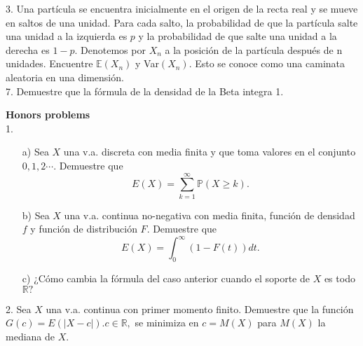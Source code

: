 \documentclass[11pt,letterpaper]{article}
\newcommand{\mP}{\mathbb{P}}
\newcommand{\mE}{\mathbb{E}}
\begin{document}
3. Una partícula se encuentra inicialmente en el origen de la recta real y se mueve en saltos de una unidad. Para cada salto, la probabilidad de que la partícula salte una unidad a la izquierda es $p$ y la probabilidad de que salte una unidad a la derecha es $1-p$. Denotemos por $X_n$ a la posición de la partícula después de n unidades. Encuentre $\mE(X_n)$ y Var$(X_n)$. Esto se conoce como una caminata aleatoria en una dimensión. \\



7. Demuestre que la fórmula de la densidad de la Beta integra 1.


\textbf{Honors problems} \\
1. \begin{itemize}
\item[a)] Sea $X$ una v.a. discreta con media finita y que toma valores en el conjunto $0,1,2\cdots .$ Demuestre que 
$$E(X)=\sum_{k=1}^\infty \mP(X\geq k).$$
\item[b)] Sea $X$ una v.a. continua no-negativa con media finita, función de densidad $f$ y función de distribución $F$. Demuestre que 
$$E(X)=\int_0^\infty (1-F(t))dt.$$

\item[c)] ¿Cómo cambia la fórmula del caso anterior cuando el soporte de $X$ es todo $\mathbb{R}?$
\end{itemize}
2. Sea $X$ una v.a. continua con primer momento finito. Demuestre que la función $G(c)=E(|X-c|). c\in \mathbb{R},$ se minimiza en $c=M(X)$ para $M(X)$ la mediana de $X$.
\end{document}

